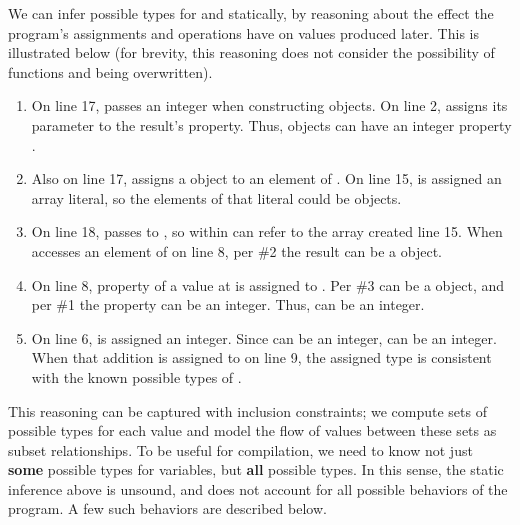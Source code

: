 We can infer possible types for  and  statically,
by reasoning about the effect the program's assignments
and operations have on values produced later.
This is illustrated below (for brevity, this reasoning does not consider
the possibility of functions  and  being overwritten).

\begin{enumerate}
\item On line 17,  passes an integer when constructing 
      objects. On line 2,  assigns its parameter to the result's
       property. Thus,  objects can have an
      integer property .
\item Also on line 17,  assigns a  object to an element
      of . On line 15,  is assigned an array literal,
      so the elements of that literal could be  objects.
\item On line 18,  passes  to , so 
      within  can refer to the array created line 15.
      When  accesses an element of  on line 8,
      per \#2 the result can be a  object.
\item On line 8, property  of a value at  is assigned to .
      Per \#3  can be a  object, and per \#1 the
       property can be an integer. Thus,  can be an integer.
\item On line 6,  is assigned an integer. Since  can be
      an integer,  can be an integer.
      When that addition is assigned to  on line 9, the assigned
      type is consistent with the known possible types of .
\end{enumerate}

This reasoning can be captured with inclusion constraints; we compute
sets of possible types for each value and model the flow of values between
these sets as subset relationships.
To be useful for compilation, we need to know not just {\bf some}
possible types for variables, but {\bf all} possible types.
In this sense, the static inference above is unsound, and does not account
for all possible behaviors of the program.
A few such behaviors are described below.

